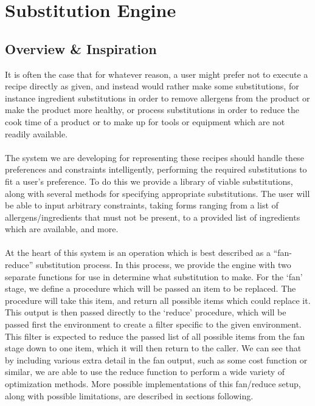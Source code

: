 \newpage
\section{Substitution Engine}
\subsection{Overview \& Inspiration}
It is often the case that for whatever reason, a user might prefer not to execute a recipe directly as given, and instead would rather make some substitutions, for instance ingredient substitutions in order to remove allergens from the product or make the product more healthy, or process substitutions in order to reduce the cook time of a product or to make up for tools or equipment which are not readily available.

\paragraph{}
The system we are developing for representing these recipes should handle these preferences and constraints intelligently, performing the required substitutions to fit a user's preference. To do this we provide a library of viable substitutions, along with several methods for specifying appropriate substitutions. The user will be able to input arbitrary constraints, taking forms ranging from a list of allergens/ingredients that must not be present, to a provided list of ingredients which are available, and more.

\paragraph{}
At the heart of this system is an operation which is best described as a ``fan-reduce'' substitution process. In this process, we provide the engine with two separate functions for use in determine what substitution to make. For the `fan' stage, we define a procedure which will be passed an item to be replaced. The procedure will take this item, and return all possible items which could replace it. This output is then passed directly to the `reduce' procedure, which will be passed first the environment to create a filter specific to the given environment. This filter is expected to reduce the passed list of all possible items from the fan stage down to one item, which it will then return to the caller. We can see that by including various extra detail in the fan output, such as some cost function or similar, we are able to use the reduce function to perform a wide variety of optimization methods. More possible implementations of this fan/reduce setup, along with possible limitations, are described in sections following.

